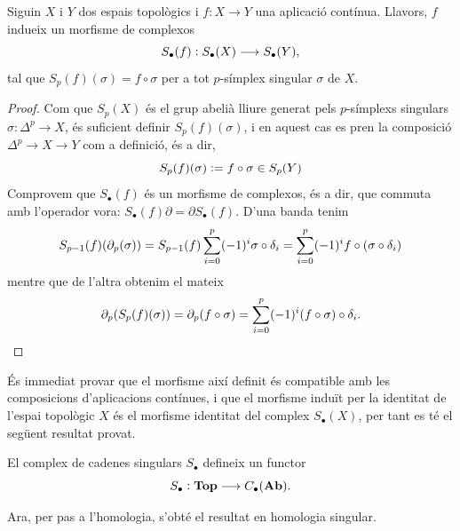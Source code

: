 \documentclass[../main.tex]{subfiles}
\begin{document}
\begin{prop}
Siguin $X$ i $Y$ dos espais topològics i $f:X\rightarrow Y$ una aplicació contínua. Llavors, $f$ indueix un morfisme de complexos
\begin{equation}
    \notag
    S_\bullet(f):S_\bullet(X)\longrightarrow S_\bullet(Y),
\end{equation}
tal que $S_p(f)(\sigma) = f\circ\sigma$ per a tot $p$-símplex singular $\sigma$ de $X$.
\end{prop}
\begin{proof}
Com que $S_p(X)$ és el grup abelià lliure generat pels $p$-símplexs singulars $\sigma:\Delta^p\rightarrow X$, és suficient definir $S_p(f)(\sigma)$, i en aquest cas es pren la composició $\Delta^p\rightarrow X\rightarrow Y$ com a definició, és a dir,
\begin{equation}
    \notag
    S_p(f)(\sigma):=f\circ \sigma\in S_p(Y)
\end{equation}
Comprovem que $S_\bullet(f)$ és un morfisme de complexos, és a dir, que commuta amb l'operador vora: $S_\bullet(f)\partial = \partial S_\bullet(f)$. D'una banda tenim
\begin{equation}
    \notag
    S_{p-1}(f)(\partial_p(\sigma)) = S_{p-1}(f)\sum_{i=0}^p(-1)^{i}\sigma\circ\delta_i = \sum_{i=0}^p(-1)^{i}f\circ(\sigma\circ\delta_i)
\end{equation}
mentre que de l'altra obtenim el mateix
\begin{equation}
    \notag
    \partial_{p}(S_p(f)(\sigma)) = \partial_{p}(f\circ\sigma)= \sum_{i=0}^p(-1)^{i}(f\circ\sigma)\circ\delta_i.
\end{equation}
\end{proof}

És immediat provar que el morfisme així definit és compatible amb les composicions d'aplicacions contínues, i que el morfisme induït per la identitat de l'espai topològic $X$ és el morfisme identitat del complex $S_\bullet(X)$, per tant es té el següent resultat provat.

\begin{lema}
El complex de cadenes singulars $S_\bullet$ defineix un functor
\begin{equation}
    \notag
    S_\bullet:\mathbf{Top}\longrightarrow C_\bullet(\mathbf{Ab}).
\end{equation}
\end{lema}

Ara, per pas a l'homologia, s'obté el resultat en homologia singular.
\end{document}
